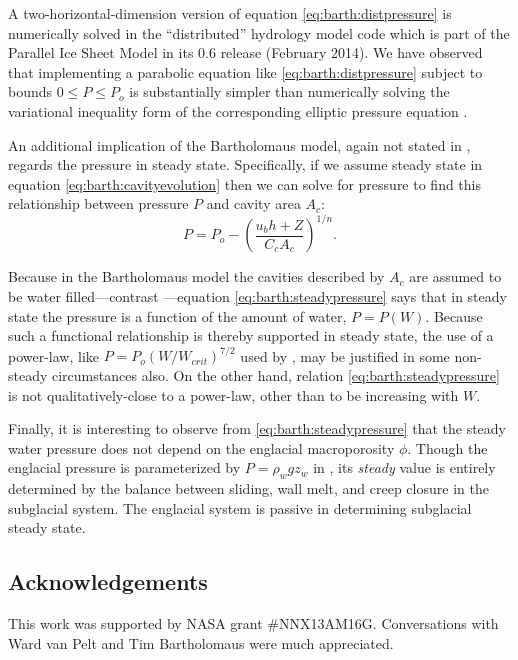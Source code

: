 \documentclass[twocolumn,letterpaper]{igs}
\begin{document}
A two-horizontal-dimension version of equation \eqref{eq:barth:distpressure} is numerically solved in the ``distributed'' hydrology model code which is part of the Parallel Ice Sheet Model in its 0.6 release (February 2014).  We have observed that implementing a parabolic equation like \eqref{eq:barth:distpressure} subject to bounds $0 \le P \le P_o$ is substantially simpler than numerically solving the variational inequality form of the corresponding elliptic pressure equation \citep{Schoofetal2012}. 

An additional implication of the Bartholomaus model, again not stated in \cite{Bartholomausetal2011}, regards the pressure in steady state.  Specifically, if we assume steady state in equation \eqref{eq:barth:cavityevolution} then we can solve for pressure to find this relationship between pressure $P$ and cavity area $A_c$:
\begin{equation}
P = P_o - \left(\frac{u_b h + Z}{C_c A_c}\right)^{1/n}. \label{eq:barth:steadypressure}
\end{equation}

Because in the Bartholomaus model the cavities described by $A_c$ are assumed to be water filled---contrast \citep{Schoofetal2012}---equation \eqref{eq:barth:steadypressure} says that in steady state the pressure is a function of the amount of water, $P=P(W)$.  Because such a functional relationship is thereby supported in steady state, the use of a power-law, like $P = P_o (W/W_{crit})^{7/2}$ used by \cite{FlowersClarke2002_theory}, may be justified in some non-steady circumstances also.  On the other hand, relation \eqref{eq:barth:steadypressure} is not qualitatively-close to a power-law, other than to be increasing with $W$.  

Finally, it is interesting to observe from \eqref{eq:barth:steadypressure} that the steady water pressure does not depend on the englacial macroporosity $\phi$.  Though the englacial pressure is parameterized by $P=\rho_w g z_w$ in \cite{Bartholomausetal2011}, its \emph{steady} value is entirely determined by the balance between sliding, wall melt, and creep closure in the subglacial system.  The englacial system is passive in determining subglacial steady state.


\subsection*{Acknowledgements}  This work was supported by NASA grant \#NNX13AM16G.  Conversations with Ward van Pelt and Tim Bartholomaus were much appreciated.



\end{document}
